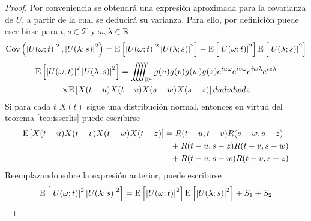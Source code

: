 
\begin{proof}
Por conveniencia se obtendrá una expresión aproximada para la covarianza de $U$, a partir de la cual se deducirá su varianza. 
%
Para ello, por definición puede escribirse para $t,s \in \mathcal{T}$ y $\omega, \lambda \in \mathbb{R}$
\begin{align*}
\mathrm{Cov}\left( \left| U(\omega;t) \right|^{2},\left| U(\lambda;s) \right|^{2} \right) =
\mathrm{E}\left[ \left| U(\omega;t) \right|^{2} \left| U(\lambda;s) \right|^{2} \right] - 
\mathrm{E}\left[ \left| U(\omega;t) \right|^{2} \right] \mathrm{E}\left[ \left| U(\lambda;s) \right|^{2} \right]
\end{align*}
\begin{multline}
\mathrm{E}\left[ \left| U(\omega;t) \right|^{2} \left| U(\lambda;s) \right|^{2} \right]
=
\iiiint_{\mathbb{R}^{4}} g(u) g(v) g(w) g(z) e^{i u \omega} e^{i v \omega} e^{i w \lambda} e^{i z \lambda} \\
 \times
\mathrm{E}\left[ {X(t-u)} {X(t-v)} {X(s-w)} {X(s-z)} \right]
du dv dw dz 
\end{multline}
Si para cada $t$ $X(t)$ sigue una distribución normal, entonces en virtud del teorema \ref{teo:isserlis} puede escribirse
\begin{align*}
\E{X(t-u) {X(t-v)} {X(t-w)} X(t-z)} 
&=       R(t-u,t-v)R(s-w,s-z) \\
&\pheq + R(t-u,s-z)R(t-v,s-w) \\
&\pheq + R(t-u,s-w)R(t-v,s-z)
\end{align*}
Reemplazando sobre la expresión anterior, puede escribirse
\begin{equation}
\mathrm{E}\left[ \left| U(\omega;t) \right|^{2} \left| U(\lambda;s) \right|^{2} \right] = \mathrm{E}\left[ \left| U(\omega;t) \right|^{2} \right] \mathrm{E}\left[ \left| U(\lambda;s) \right|^{2} \right]+ S_1 + S_2
\end{equation}

\end{proof}
